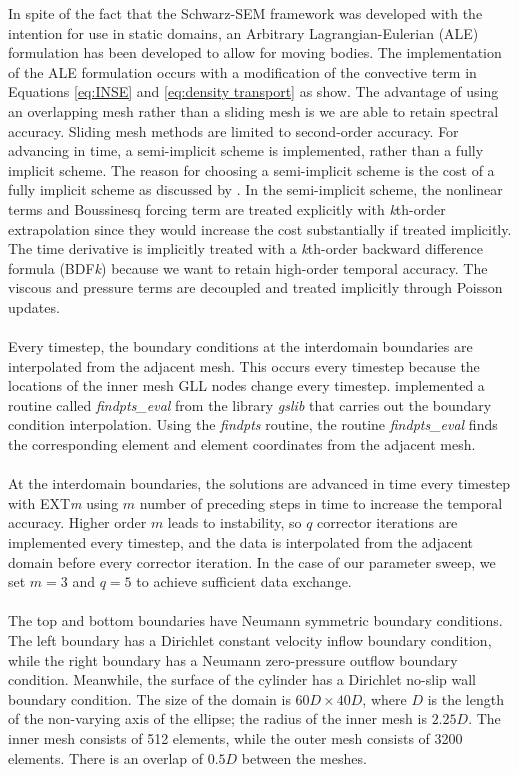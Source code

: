 In spite of the fact that the Schwarz-SEM framework was developed with the intention for use in static domains, an Arbitrary Lagrangian-Eulerian (ALE) formulation has been developed to allow for moving bodies. The implementation of the ALE formulation occurs with a modification of the convective term in Equations \ref{eq:INSE} and \ref{eq:density transport} as \cite{merrill_moving_2019} show. The advantage of using an overlapping mesh rather than a sliding mesh is we are able to retain spectral accuracy. Sliding mesh methods are limited to second-order accuracy.
For advancing in time, a semi-implicit scheme is implemented, rather than a fully implicit scheme. The reason for choosing a semi-implicit scheme is the cost of a fully implicit scheme as discussed by \cite{tomboulides_numerical_1997}. In the semi-implicit scheme, the nonlinear terms and Boussinesq forcing term are treated explicitly with \textit{k}th-order extrapolation since they would increase the cost substantially if treated implicitly. The time derivative is implicitly treated with a \textit{k}th-order backward difference formula (BDF\textit{k}) because we want to retain high-order temporal accuracy. The viscous and pressure terms are decoupled and treated implicitly through Poisson updates.\\\\
Every timestep, the boundary conditions at the interdomain boundaries are interpolated from the adjacent mesh. This occurs every timestep because the locations of the inner mesh GLL nodes change every timestep. \cite{mittal_nonconforming_2019} implemented a routine called \textit{findpts\_eval} from the library \textit{gslib} that carries out the boundary condition interpolation. Using the \textit{findpts} routine, the routine \textit{findpts\_eval} finds the corresponding element and element coordinates from the adjacent mesh.\\\\
At the interdomain boundaries, the solutions are advanced in time every timestep with EXT\textit{m} using $m$ number of preceding steps in time to increase the temporal accuracy. Higher order $m$ leads to instability, so $q$ corrector iterations are implemented every timestep, and the data is interpolated from the adjacent domain before every corrector iteration. In the case of our parameter sweep, we set $m=3$ and $q=5$ to achieve sufficient data exchange. \\\\  
The top and bottom boundaries have Neumann symmetric boundary conditions. The left boundary has a Dirichlet constant velocity inflow boundary condition, while the right boundary has a Neumann zero-pressure outflow boundary condition. Meanwhile, the surface of the cylinder has a Dirichlet no-slip wall boundary condition. The size of the domain is $60D \times 40D$, where $D$ is the length of the non-varying axis of the ellipse; the radius of the inner mesh is $2.25D$. The inner mesh consists of 512 elements, while the outer mesh consists of 3200 elements. There is an overlap of $0.5D$ between the meshes. 

\clearpage
